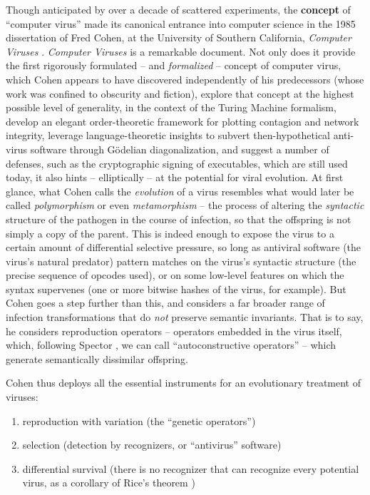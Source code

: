 \documentclass[12pt,glossary]{dalthesis}
\begin{document}
Though anticipated by over a decade of scattered experiments, the \textbf{concept} of
``computer virus'' made its canonical entrance into computer science in the 1985
dissertation of Fred Cohen, at the University of Southern California, \emph{Computer
Viruses} \cite{cohen85}. \emph{Computer Viruses} is a remarkable document. Not only does it provide
the first rigorously formulated -- and \emph{formalized} -- concept of computer
virus, which Cohen appears to have discovered independently of his predecessors
(whose work was confined to obscurity and fiction), explore that concept at the
highest possible level of generality, in the context of the Turing Machine
formalism, develop an elegant order-theoretic framework for plotting contagion
and network integrity, leverage language-theoretic insights to subvert
then-hypothetical  anti-virus software through
G\"{o}delian diagonalization, and suggest a number of defenses, such as the
cryptographic signing of executables, which are still used today, it also hints
-- elliptically -- at the potential for viral evolution. At first glance, what
Cohen calls the \emph{evolution} of a virus resembles what would later be called
\emph{polymorphism} or even \emph{metamorphism}
-- the process of altering the \emph{syntactic} structure of the pathogen in the
course of infection, so that the offspring is not simply a copy of the parent.
This is indeed enough to expose the virus to a certain amount of differential
selective pressure, so long as antiviral software (the virus's natural predator)
pattern matches on the virus's syntactic structure (the precise sequence of
opcodes used), or on some low-level features on which the syntax supervenes (one
or more bitwise hashes of the virus, for example). But Cohen goes a step further
than this, and considers a far broader range of infection transformations that
do \emph{not} preserve semantic invariants. That is to say, he considers reproduction
operators -- operators embedded in the virus itself, which, following
Spector \cite{spector01}, we can call ``autoconstructive operators'' -- which
generate semantically dissimilar offspring.

Cohen thus deploys all the essential instruments for an evolutionary treatment
of viruses:

\begin{enumerate}
\item reproduction with variation (the ``genetic operators'')
\item selection (detection by recognizers, or ``antivirus'' software)
\item differential survival (there is no recognizer that can recognize
every potential virus, as a corollary of Rice's theorem \cite{rice53})
\end{enumerate}
\end{document}
